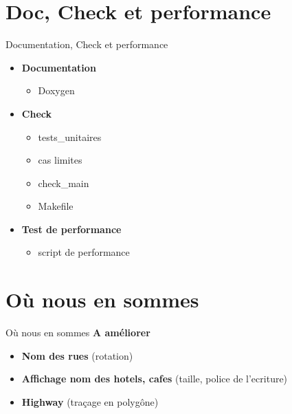 \documentclass[french]{beamer}
\begin{document}
\section{Doc, Check et performance}
\begin{frame}{Documentation, Check et performance}
  \begin{itemize}
	\item <1-9>\textbf{Documentation}
	\begin{itemize}
	\item  <2-9>Doxygen
	\end{itemize}
 	\item <3-9> \textbf{Check}
	\begin{itemize}
	\item  <4-9>tests\_unitaires
	\item  <5-9>cas limites
	\item  <6-9>check\_main
	\item  <7-9>Makefile
	\end{itemize}
	\item <8-9> \textbf{Test de performance}
	\begin{itemize}
	\item  <9>script de performance
	\end{itemize}
      \end{itemize}
\end{frame}

\section{Où nous en sommes}
\begin{frame}{Où nous en sommes}
	 \textbf{A améliorer}
	 \begin{itemize}
	 \item<1-3>\textbf{Nom des rues} (rotation)
	 \item<2-3>\textbf{Affichage nom des hotels, cafes} (taille, police de l'ecriture)
 	 \item<3> \textbf{Highway} (traçage en polygône)
	\end{itemize}
\end{frame}
\end{document}
